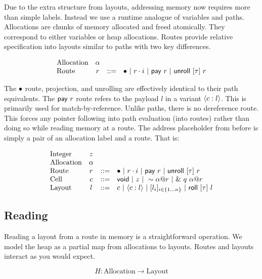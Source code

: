 Due to the extra structure from layouts, addressing memory now requires
more than simple labels. Instead we use a runtime analogue of variables and paths.
Allocations are chunks of memory allocated and freed atomically.
They correspond to either variables or heap allocations.
Routes provide relative specification into layouts similar to paths with two key differences.

\[
\begin{array}{lccl}
\textrm{Allocation} & \alpha & & \\
\textrm{Route} & r & ::= & \bullet ~|~ {r}\cdot{i} ~|~ \mathsf{pay}~{r} ~|~ \mathsf{unroll}~[{\tau}]~{r} \\
\end{array}
\]

The $\bullet$ route, projection, and unrolling are effectively identical to their path equivalents.
The $\mathsf{pay}~{r}$ route refers to the payload $l$ in a variant $\langle{{c}:{l}}\rangle$.
This is primarily used for match-by-reference.
Unlike paths, there is no dereference route.
This forces any pointer following into path evaluation (into routes)
rather than doing so while reading memory at a route.
The address placeholder from before is simply a pair of an allocation label and a route.
That is:

\[
\begin{array}{lccl}
\textrm{Integer} & z & & \\
\textrm{Allocation} & \alpha & & \\
\textrm{Route} & r & ::= & \bullet ~|~ {r}\cdot{i} ~|~ \mathsf{pay}~{r} ~|~ \mathsf{unroll}~[{\tau}]~{r} \\
\textrm{Cell} & c & ::= & \mathsf{void} ~|~ z ~|~ 
			      \sim{{\alpha}@{r}} ~|~ \&~{{q}~{{\alpha}@{r}}} \\
\textrm{Layout} & l & ::= & c ~|~ \langle{{c}:{l}}\rangle ~|~ 
			       [{{l}_{i}}]_{{i} \in \{1 \ldots {n}\} } ~|~ \mathsf{roll}~[{\tau}]~{l} \\
\end{array}
\]

\subsection*{Reading}

Reading a layout from a route in memory is a straightforward operation.
We model the heap as a partial map from allocations to layouts.
Routes and layouts interact as you would expect.

$$ H : \mathrm{Allocation} \to \mathrm{Layout} $$

